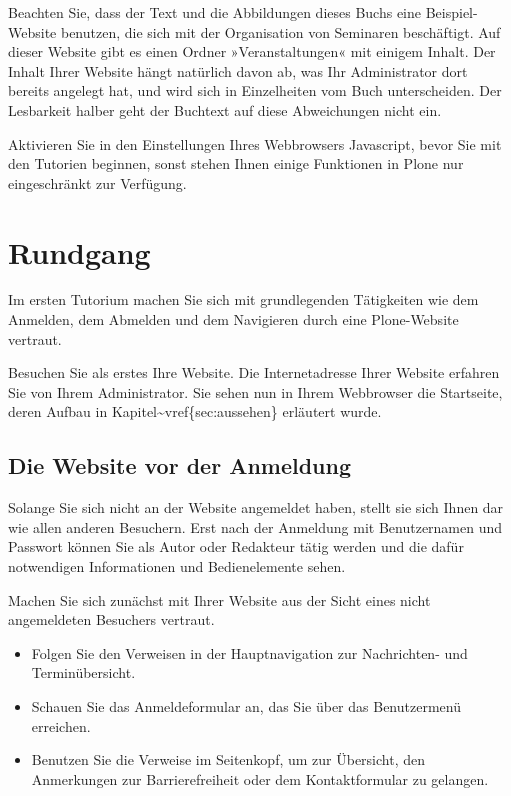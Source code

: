 \documentclass[a4paper,12pt,ngerman]{manual}
\begin{document}
Beachten Sie, dass der Text und die Abbildungen dieses Buchs eine
Beispiel-Website benutzen, die sich mit der Organisation von Seminaren
beschäftigt. Auf dieser Website gibt es einen Ordner »Veranstaltungen« mit
einigem Inhalt. Der Inhalt Ihrer Website hängt natürlich davon ab, was Ihr
Administrator dort bereits angelegt hat, und wird sich in Einzelheiten vom
Buch unterscheiden. Der Lesbarkeit halber geht der Buchtext
auf diese Abweichungen nicht ein.

Aktivieren Sie in den Einstellungen Ihres Webbrowsers Javascript, bevor Sie
mit den Tutorien beginnen, sonst stehen Ihnen einige Funktionen in
Plone nur eingeschränkt zur Verfügung.

\resetcurrentobjects
\hypertarget{--doc-tutorien/rundgang}{}

\section{Rundgang}

Im ersten Tutorium machen Sie sich mit grundlegenden Tätigkeiten wie dem
Anmelden, dem Abmelden und dem Navigieren durch eine Plone-Website vertraut.

Besuchen Sie als erstes Ihre Website. Die Internetadresse Ihrer Website
erfahren Sie von Ihrem Administrator. Sie sehen nun in Ihrem
Webbrowser die Startseite, deren Aufbau in Kapitel\textasciitilde{}vref\{sec:aussehen\}
erläutert wurde.


\subsection{Die Website vor der Anmeldung}

Solange Sie sich nicht an der Website angemeldet haben, stellt sie sich Ihnen
dar wie allen anderen Besuchern. Erst nach der Anmeldung mit
Benutzernamen und Passwort können Sie als Autor oder Redakteur tätig
werden und die dafür notwendigen Informationen und Bedienelemente sehen.

Machen Sie sich zunächst mit Ihrer Website aus der Sicht eines nicht
angemeldeten Besuchers vertraut.
\begin{itemize}
\item {} 
Folgen Sie den Verweisen in der Hauptnavigation zur Nachrichten- und
Terminübersicht.

\item {} 
Schauen Sie das Anmeldeformular an, das Sie über das Benutzermenü
erreichen.

\item {} 
Benutzen Sie die Verweise im Seitenkopf, um zur Übersicht, den
Anmerkungen zur Barrierefreiheit oder dem Kontaktformular zu gelangen.

\end{itemize}
\hypertarget{sec-benutz-registr-und}{}
\end{document}
